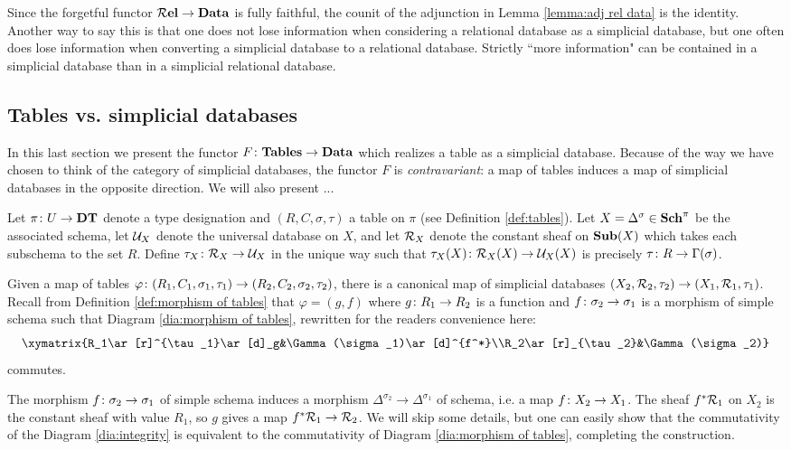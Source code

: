 \documentclass{amsart}
\def\DT{{\bf DT}}
\def\Sch{{\bf Sch}}
\def\Tables{{\bf Tables}}
\def\mcRel{{\bf \mcR el}}
\def\Sub{{\bf Sub}}
\def\Data{{\bf Data}}
\begin{document}
Since the forgetful functor $\mcRel\to\Data$ is fully faithful, the counit of the adjunction in Lemma \ref{lemma:adj rel data} is the identity.  Another way to say this is that one does not lose information when considering a relational database as a simplicial database, but one often does lose information when converting a simplicial database to a relational database.  Strictly ``more information" can be contained in a simplicial database than in a simplicial relational database.

\subsection{Tables vs. simplicial databases}

In this last section we present the functor $F\taking\Tables\to\Data$ which realizes a table as a simplicial database.  Because of the way we have chosen to think of the category of simplicial databases, the functor $F$ is {\em contravariant}: a map of tables induces a map of simplicial databases in the opposite direction.  We will also present ...

\begin{construction}\label{con:table as database}

Let $\pi\taking U\to\DT$ denote a type designation and $(R,C,\sigma,\tau)$ a table on $\pi$ (see Definition \ref{def:tables}).  Let $X=\Delta^\sigma\in\Sch^\pi$ be the associated schema, let $\mathcal{U}_X$ denote the universal database on $X$, and let $\mathcal{R}_X$ denote the constant sheaf on $\Sub(X)$ which takes each subschema to the set $R$.  Define $\tau_X\colon\mathcal{R}_X\rightarrow\mathcal{U}_X$ in the unique way such that $\tau_X(X)\colon\mathcal{R}_X(X)\rightarrow\mathcal{U}_X(X)$ is precisely $\tau\colon R\rightarrow\Gamma(\sigma)$. 

Given a map of tables $\varphi\colon(R_1,C_1,\sigma_1,\tau_1)\rightarrow(R_2,C_2,\sigma_2,\tau_2)$, there is a canonical map of simplicial databases $(X_2,\mathcal{R}_2,\tau_2)\rightarrow(X_1,\mathcal{R}_1,\tau_1)$.  Recall from Definition \ref{def:morphism of tables} that $\varphi=(g,f)$ where $g\colon R_1\rightarrow R_2$ is a function and $f\colon\sigma_2\rightarrow\sigma_1$ is a morphism of simple schema such that Diagram \ref{dia:morphism of tables}, rewritten for the readers convenience here: $$\xymatrix{R_1\ar[r]^{\tau_1}\ar[d]_g&\Gamma(\sigma_1)\ar[d]^{f^*}\\R_2\ar[r]_{\tau_2}&\Gamma(\sigma_2)}$$ commutes.

The morphism $f\colon\sigma_2\rightarrow\sigma_1$ of simple schema induces a morphism $\Delta^{\sigma_2}\to\Delta^{\sigma_1}$ of schema, i.e. a map $f\colon X_2\rightarrow X_1$.  The sheaf $f^*\mathcal{R}_1$ on $X_2$ is the constant sheaf with value $R_1$, so $g$ gives a map $f^*\mathcal{R}_1\rightarrow\mathcal{R}_2$.  We will skip some details, but one can easily show that the commutativity of the Diagram \ref{dia:integrity} is equivalent to the commutativity of Diagram \ref{dia:morphism of tables}, completing the construction.

\end{construction}
\end{document}
